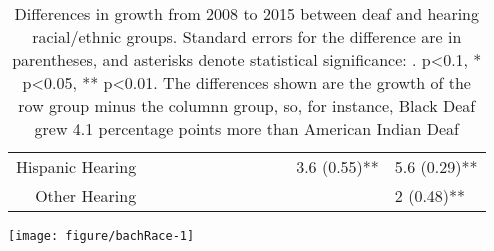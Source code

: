 \documentclass{article}\usepackage[]{graphicx}\usepackage[]{color}
\makeatletter
\def\maxwidth{ %
  \ifdim\Gin@nat@width>\linewidth
    \linewidth
  \else
    \Gin@nat@width
  \fi
}
\newenvironment{knitrout}{}{} %
\makeatother
\begin{document}
\begin{landscape}
\begin{table}[ht]
\begin{tabular}{rlllllllllll}
  Hispanic Hearing &  &  &  &  &  &  &  &  &  & 3.6 (0.55)** & 5.6 (0.29)** \\
  Other Hearing &  &  &  &  &  &  &  &  &  &  & 2 (0.48)** \\
   \hline
\end{tabular}
\endgroup
\caption{Differences in growth from 2008 to 2015 between deaf and hearing racial/ethnic
groups. Standard errors for the difference are in parentheses, and asterisks denote statistical significance: . p<0.1, * p<0.05, ** p<0.01. The differences shown are the growth of the row group minus the columnn group, so, for instance, Black Deaf grew 4.1 percentage points more than American Indian Deaf}
\label{tab:hsRaceGrowth}
\end{table}

\end{landscape}

\begin{center}
\begin{knitrout}
\color{fgcolor}
\texttt{[image: figure/bachRace-1]}

\end{knitrout}
\end{center}
\end{document}
